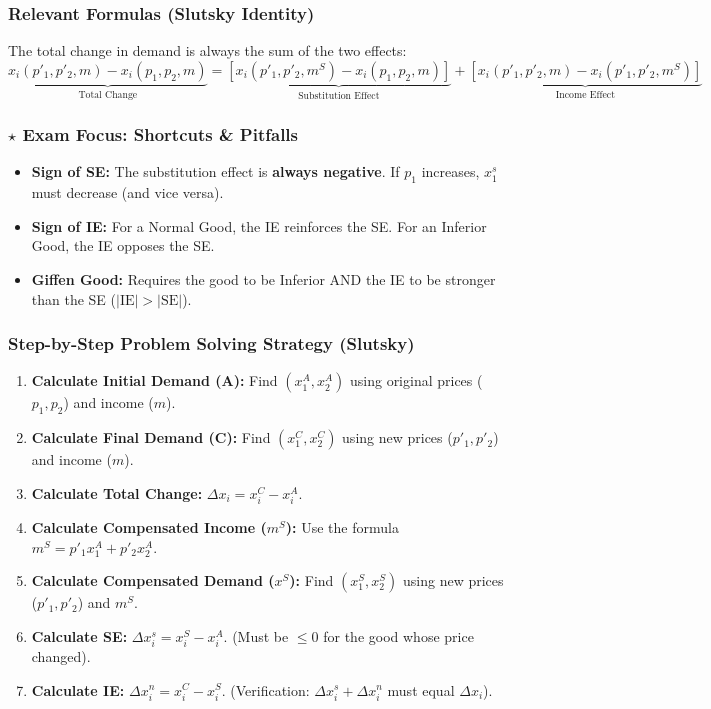 \documentclass{article}
\begin{document}
\subsubsection*{Relevant Formulas (Slutsky Identity)}
The total change in demand is always the sum of the two effects: \[\underbrace{x_i(p'_1, p'_2, m) - x_i(p_1, p_2, m)}_{\text{Total Change}} = \underbrace{\left[x_i(p'_1, p'_2, m^S) - x_i(p_1, p_2, m)\right]}_{\text{Substitution Effect}} + \underbrace{\left[x_i(p'_1, p'_2, m) - x_i(p'_1, p'_2, m^S)\right]}_{\text{Income Effect}}\]

\subsubsection*{$\star$ Exam Focus: Shortcuts \& Pitfalls}
\begin{itemize}
	\item \textbf{Sign of SE:} The substitution effect is \textbf{always negative}. If $p_1$ increases, $x_1^s$ must decrease (and vice versa).
	\item \textbf{Sign of IE:} For a Normal Good, the IE reinforces the SE. For an Inferior Good, the IE opposes the SE.
	\item \textbf{Giffen Good:} Requires the good to be Inferior AND the IE to be stronger than the SE ($|\text{IE}| > |\text{SE}|$).
\end{itemize}

\subsubsection*{Step-by-Step Problem Solving Strategy (Slutsky)}
\begin{enumerate}
	\item \textbf{Calculate Initial Demand (A):} Find $(x_1^A, x_2^A)$ using original prices ($p_1, p_2$) and income ($m$).
	\item \textbf{Calculate Final Demand (C):} Find $(x_1^C, x_2^C)$ using new prices ($p'_1, p'_2$) and income ($m$).
	\item \textbf{Calculate Total Change:} $\Delta x_i = x_i^C - x_i^A$.
	\item \textbf{Calculate Compensated Income ($m^S$):} Use the formula $m^S = p'_1 x_1^A + p'_2 x_2^A$.
	\item \textbf{Calculate Compensated Demand ($x^S$):} Find $(x_1^S, x_2^S)$ using new prices ($p'_1, p'_2$) and $m^S$.
	\item \textbf{Calculate SE:} $\Delta x_i^s = x_i^S - x_i^A$. (Must be $\leq 0$ for the good whose price changed).
	\item \textbf{Calculate IE:} $\Delta x_i^n = x_i^C - x_i^S$. (Verification: $\Delta x_i^s + \Delta x_i^n$ must equal $\Delta x_i$).
\end{enumerate}
\hrulefill
\end{document}
